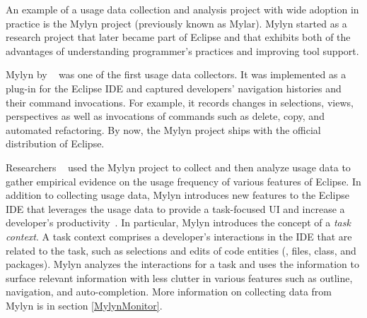 
An example of a usage data collection and analysis project with wide adoption
in practice is the Mylyn project (previously known as Mylar). Mylyn started as a research project that later became part of Eclipse and that exhibits both of the advantages of understanding programmer's practices and improving tool support.

Mylyn by ~ was one of the first usage data collectors. It was
implemented as a plug-in for the Eclipse IDE and captured developers' navigation
histories and their command invocations. For example, it records changes in
selections, views, perspectives as well as invocations of commands such as
delete, copy, and automated refactoring. By now, the Mylyn project ships with the official distribution of Eclipse.

Researchers ~ used the Mylyn project to collect and then analyze usage data to gather empirical evidence on the usage frequency of various features of Eclipse.  In addition to collecting usage data, Mylyn introduces new features to the Eclipse
IDE that leverages the usage data to provide a task-focused UI and increase a developer's productivity~\cite{Kersten-Mylyn}. In particular, Mylyn introduces the concept of a \emph{task context}. A task context comprises a developer's interactions in the IDE that are related to the task, such as selections and edits of code entities (\eg, files, class, and packages). Mylyn analyzes the interactions for a task and uses the information to surface relevant information with less clutter in various features such as outline, navigation, and auto-completion.  More information on collecting data from Mylyn is in section \ref{MylynMonitor}.

%



